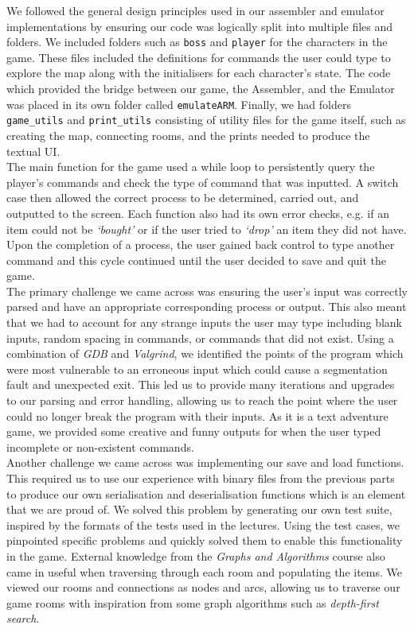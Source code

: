 \documentclass[10pt]{article}
\begin{document}
We followed the general design principles used in our assembler and emulator implementations by ensuring our code was logically split into multiple files and folders. We included folders such as {\tt boss} and {\tt player} for the characters in the game. These files included the definitions for commands the user could type to explore the map along with the initialisers for each character’s state. The code which provided the bridge between our game, the Assembler, and the Emulator was placed in its own folder called {\tt emulateARM}. Finally, we had folders {\tt game\_utils} and {\tt print\_utils} consisting of utility files for the game itself, such as creating the map, connecting rooms, and the prints needed to produce the textual UI. 
\\

The main function for the game used a while loop to persistently query the player’s commands and check the type of command that was inputted. A switch case then allowed the correct process to be determined, carried out, and outputted to the screen. Each function also had its own error checks, e.g. if an item could not be {\sl ‘bought’} or if the user tried to {\sl ‘drop’} an item they did not have. Upon the completion of a process, the user gained back control to type another command and this cycle continued until the user decided to save and quit the game. 
\\

The primary challenge we came across was ensuring the user’s input was correctly parsed and have an appropriate corresponding process or output. This also meant that we had to account for any strange inputs the user may type including blank inputs, random spacing in commands, or commands that did not exist. Using a combination of {\sl GDB} and {\sl Valgrind}, we identified the points of the program which were most vulnerable to an erroneous input which could cause a segmentation fault and unexpected exit. This led us to provide many iterations and upgrades to our parsing and error handling, allowing us to reach the point where the user could no longer break the program with their inputs. As it is a text adventure game, we provided some creative and funny outputs for when the user typed incomplete or non-existent commands. 
\\

Another challenge we came across was implementing our save and load functions. This required us to use our experience with binary files from the previous parts to produce our own serialisation and deserialisation functions which is an element that we are proud of. We solved this problem by generating our own test suite, inspired by the formats of the tests used in the lectures. Using the test cases, we pinpointed specific problems and quickly solved them to enable this functionality in the game. External knowledge from the {\sl Graphs and Algorithms} course also came in useful when traversing through each room and populating the items. We viewed our rooms and connections as nodes and arcs, allowing us to traverse our game rooms with inspiration from some graph algorithms such as {\sl depth-first search}. 
\end{document}
